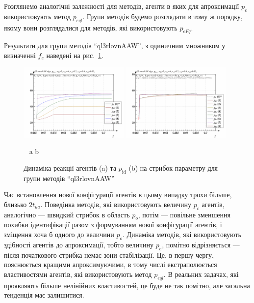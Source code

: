 
Розглянемо аналогічні залежності для методів, агенти в яких
для апроксимації
$ p_e $ використовують метод
$ p_{eql} $. Групи методів будемо розглядати в тому ж порядку, якому
вони розглядалися для методів, які використовують
$ p_{eFq} $.

Результати для групи методів ``ql3rlovnAAW'', з одиничним множником
у визначенні
$ f_e $ наведені на рис.~\ref{atu:f:ql3rlovnAAW_sign}.

\begin{figure}[htb!]
  \begin{center}
    \includegraphics[width=0.48\textwidth]{p/sign/qls-p_t_pi_m_ql3rlovnAAW_sign.png}
    \hfill
    \includegraphics[width=0.48\textwidth]{p/sign/qls-p_t_p_m_ql3rlovnAAW_sign.png}
  \end{center}
  \vspace{-1.0ex}
  \begin{center}
    ~ \hfill a \hfill\hfill b  \hfill ~
  \end{center}
  \vspace{-1.5ex}
  \caption{Динаміка реакції агентів (a) та $p_\mathrm{id}$ (b) на стрибок параметру для групи методів ``ql3rlovnAAW''}
  \label{atu:f:ql3rlovnAAW_sign}
\end{figure}

Час встановлення нової конфігурації агентів в цьому випадку
трохи більше, близько
$ 2 t_{ua} $. Поведінка методів, які використовують величину
$ p_c $ агентів, аналогічно --- швидкий стрибок в область
$ p_o $, потім --- повільне зменшення похибки ідентифікації разом
з формуванням нової конфігурації агентів, і зміщення хоча б
одного до величини
$ p_o $. Динаміка методів, які використовують
здібності агентів до апроксимації, тобто величину
$ p_e $, помітно відрізняється --- після початкового стрибка немає
зони стабілізації. Це, в першу чергу, пояснюється кращими
апроксимуючими, в тому числі екстраполюється властивостями
агентів, які використовують метод
$ p_{eql} $. В реальних задачах, які проявляють більше нелінійних
властивостей, це буде не так помітно, але загальна тенденція має
залишитися.

